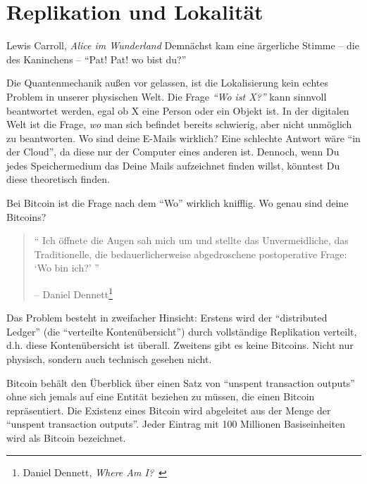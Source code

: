\chapter{Replikation und Lokalität}
\label{les:3}

\begin{chapquote}{Lewis Carroll, \textit{Alice im Wunderland}}
Demnächst kam eine ärgerliche Stimme -- die des Kaninchens -- \enquote{Pat! Pat! wo bist du?}
\end{chapquote}

Die Quantenmechanik außen vor gelassen, ist die Lokalisierung kein echtes
Problem in unserer physischen Welt. Die Frage \textit{\enquote{Wo ist X?}} kann
sinnvoll beantwortet werden, egal ob X eine Person oder ein Objekt ist. In der
digitalen Welt ist die Frage, \textit{wo} man sich befindet bereits schwierig,
aber nicht unmöglich zu beantworten. Wo sind deine E-Mails wirklich? Eine
schlechte Antwort wäre \enquote{in der Cloud}, da diese nur der Computer eines
anderen ist. Dennoch, wenn Du jedes Speichermedium das Deine Mails aufzeichnet
finden willst, könntest Du diese theoretisch finden.

Bei Bitcoin ist die Frage nach dem \enquote{Wo} wirklich knifflig. Wo genau sind
deine Bitcoins?

\begin{quotation}\begin{samepage}
\enquote{
Ich öffnete die Augen sah mich um und stellte das Unvermeidliche, das
Traditionelle, die bedauerlicherweise abgedroschene postoperative Frage:
\enquote{Wo bin ich?}
}
\begin{flushright} -- Daniel Dennett\footnote{Daniel Dennett, \textit{Where Am I?}~\cite{where-am-i}}
\end{flushright}\end{samepage}\end{quotation}

Das Problem besteht in zweifacher Hinsicht: Erstens wird der
\enquote{distributed Ledger} (die \enquote{verteilte Kontenübersicht}) durch
vollständige Replikation verteilt, d.h. diese Kontenübersicht ist überall.
Zweitens gibt es keine Bitcoins. Nicht nur physisch, sondern auch technisch
gesehen nicht.

Bitcoin behält den Überblick über einen Satz von \enquote{unspent transaction
outputs} ohne sich jemals auf eine Entität beziehen zu müssen, die einen Bitcoin
repräsentiert. Die Existenz eines Bitcoin wird abgeleitet aus der Menge der
\enquote{unspent transaction outputs}. Jeder Eintrag mit 100 Millionen
Basiseinheiten wird als Bitcoin bezeichnet.

